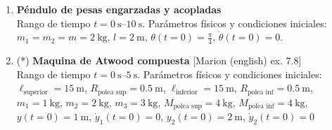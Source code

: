 \documentclass[11pt, spanish, a4paper, twoside]{article}
\begin{document}
\begin{enumerate}
\item 
	\begin{minipage}[t][3cm]{0.7\textwidth}
	\textbf{Péndulo de pesas engarzadas y acopladas}\\ 
	Rango de tiempo \(t = \SIrange{0}{10}{\second}\).
	Parámetros físicos y condiciones iniciales:\\
	\(m_1 = m_2 = m = \SI{2}{\kilo\gram}\), \(l = \SI{2}{\metre}\), \(\theta(t=0) = \frac{\pi}{4}\), \(\dot{\theta}(t=0) = 0\).
	\end{minipage}
	\begin{minipage}[c][2cm][t]{0.3\textwidth}
		
	\end{minipage}



%




\newpage
\item
\begin{minipage}[t][2cm]{0.65\textwidth}
(*) \textbf{Maquina de Atwood compuesta} [Marion (english) ex. 7.8]\\ 
Rango de tiempo \(t = \SIrange{0}{5}{\second}\).
Parámetros físicos y condiciones iniciales:\\
\(\ell_\text{superior} = \SI{15}{\metre}\), 
\(R_{\text{polea sup}} = \SI{0.5}{\metre}\), 
\(\ell_\text{inferior} = \SI{15}{\metre}\), 
\(R_{\text{polea inf}} = \SI{0.5}{\metre}\),\\ 
\(m_1 = \SI{1}{\kilo\gram}\),
\(m_2 = \SI{2}{\kilo\gram}\),
\(m_3 = \SI{3}{\kilo\gram}\),
\(M_{\text{polea sup}} = \SI{4}{\kilo\gram}\),
\(M_{\text{polea inf}} = \SI{4}{\kilo\gram}\),\\
\(y(t=0) = \SI{1}{\metre}\), \(\dot{y}_1(t=0) = 0\),
\(y_2(t=0) = \SI{2}{\metre}\), \(\dot{y}_2(t=0) = 0\)
\end{minipage}
\begin{minipage}[c][3cm][t]{0.3\textwidth}
	
\end{minipage}




\end{enumerate}
\end{document}
